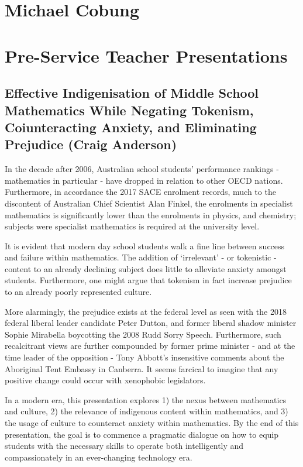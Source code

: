 \documentclass[twoside,14pt,a4paper,notitlepage]{memoir}
\begin{document}
\section*{Michael Cobung}



\pagebreak
\section*{Pre-Service Teacher Presentations}




\subsection*{Effective Indigenisation of Middle School Mathematics While Negating Tokenism, Coiunteracting Anxiety, and Eliminating Prejudice (Craig Anderson)}
\label{aut:anderson}

In the decade after 2006, Australian school students’ performance rankings - mathematics in particular - have dropped in relation to other OECD nations. Furthermore, in accordance the 2017 SACE enrolment records, much to the discontent of Australian Chief Scientist Alan Finkel, the enrolments in specialist mathematics is significantly lower than the enrolments in physics, and chemistry; subjects were specialist mathematics is required at the university level.
 
It is evident that modern day school students walk a fine line between success and failure within mathematics. The addition of ‘irrelevant’ - or tokenistic - content to an already declining subject does little to alleviate anxiety amongst students. Furthermore, one might argue that tokenism in fact increase prejudice to an already poorly represented culture.
 
More alarmingly, the prejudice exists at the federal level as seen with the 2018 federal liberal leader candidate Peter Dutton, and former liberal shadow minister Sophie Mirabella boycotting the 2008 Rudd Sorry Speech. Furthermore, such recalcitrant views are further compounded by former prime minister - and at the time leader of the opposition - Tony Abbott’s insensitive comments about the Aboriginal Tent Embassy in Canberra. It seems farcical to imagine that any positive change could occur with xenophobic legislators.
 
In a modern era, this presentation explores 1) the nexus between mathematics and culture, 2) the relevance of indigenous content within mathematics, and 3) the usage of culture to counteract anxiety within mathematics. By the end of this presentation, the goal is to commence a pragmatic dialogue on how to equip students with the necessary skills to operate both intelligently and compassionately in an ever-changing technology era.
\end{document}
